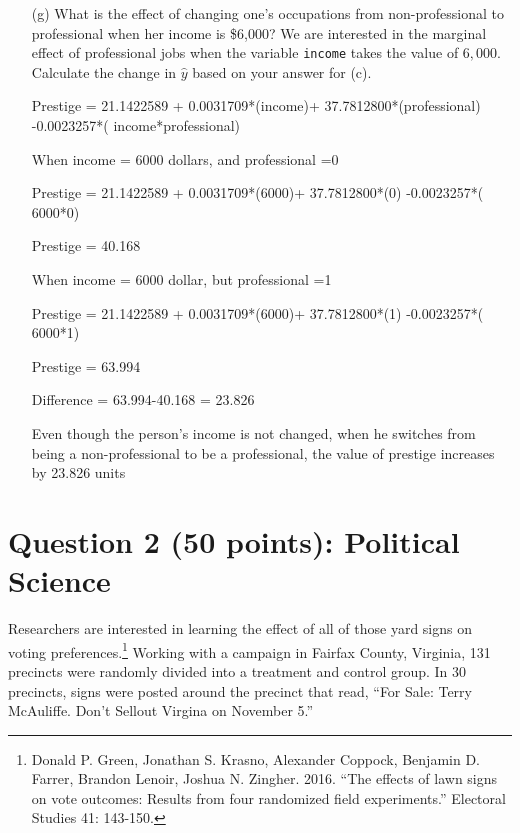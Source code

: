 \documentclass[12pt,letterpaper]{article}
\begin{document}
\begin{enumerate}
Prestige =  21.1422589 + 0.0031709*(income)+ 37.7812800*(professional) -0.0023257*( income*professional)

Because we are talking about professional only

professional =1

Prestige = (21.1422589+37.7812800)+(0.0031709-0.0023257)*(income)=59.92 + 0.0008*income

When income increases by 1000 dollars


difference = 0.0008*1000 = 0.8

The effect of 1000  dollar increase in the income given professional is 1 will be a 0.8 unit of value increases for prestige.


	\vspace{4cm}
	
	
	\item [(g)]
	What is the effect of changing one's occupations from non-professional to professional when her income is \$6,000? We are interested in the marginal effect of professional jobs when the variable \texttt{income} takes the value of $6,000$. Calculate the change in $\hat{y}$ based on your answer for (c).
	
	Prestige =  21.1422589 + 0.0031709*(income)+ 37.7812800*(professional) -0.0023257*( income*professional)
	
	When income = 6000 dollars, and professional =0 
	
	Prestige = 21.1422589 + 0.0031709*(6000)+ 37.7812800*(0) -0.0023257*( 6000*0)
	
	Prestige = 40.168
	
	When income = 6000 dollar, but professional =1
	
	Prestige = 21.1422589 + 0.0031709*(6000)+ 37.7812800*(1) -0.0023257*( 6000*1)
	
	Prestige = 63.994
	
	Difference = 63.994-40.168 = 23.826
	
	Even though the person's income is not changed, when he switches from being a non-professional to be a professional, the value of prestige increases by 23.826 units
	
	
\end{enumerate}

\newpage

\section*{Question 2 (50 points): Political Science}
\vspace{.25cm}
\noindent 	Researchers are interested in learning the effect of all of those yard signs on voting preferences.\footnote{Donald P. Green, Jonathan	S. Krasno, Alexander Coppock, Benjamin D. Farrer,	Brandon Lenoir, Joshua N. Zingher. 2016. ``The effects of lawn signs on vote outcomes: Results from four randomized field experiments.'' Electoral Studies 41: 143-150. } Working with a campaign in Fairfax County, Virginia, 131 precincts were randomly divided into a treatment and control group. In 30 precincts, signs were posted around the precinct that read, ``For Sale: Terry McAuliffe. Don't Sellout Virgina on November 5.'' \\
\end{document}
